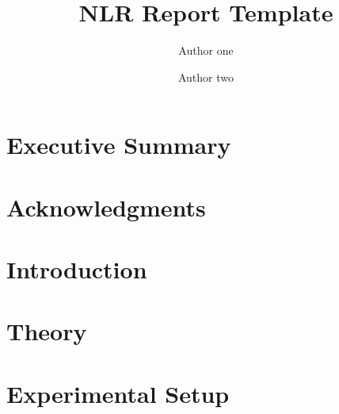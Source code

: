 \documentclass[]{nlr}
\title{NLR Report Template}
\author{Author one} %
\author{Author two} %
\affil{National Laboratory of the Rockies}
\begin{document}
\frontmatter
\chapter{Executive Summary}

\chapter{Acknowledgments}


\clearpage
\tableofcontents
\listoffigures
\listoftables

\mainmatter
\pagestyle{fancy}
\chapter{Introduction} %
\label{sec:intro}



\chapter{Theory}
\label{sec:theory}

\chapter{Experimental Setup}
\label{sec:exp}
\end{document}
